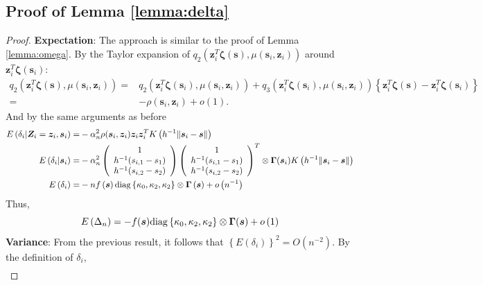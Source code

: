 \documentclass[authoryear,review, 12pt]{elsarticle}
\begin{document}
\subsection*{Proof of Lemma \ref{lemma:delta}}
\begin{proof}
\textbf{Expectation}: The approach is similar to the proof of Lemma
\ref{lemma:omega}. By the Taylor expansion of $q_{2}\left(\bm{z}_{i}^{T}\bm{\zeta}(\bm{s}),\mu\left(\bm{s}_{i},\bm{z}_{i}\right)\right)$
around $\bm{z}_{i}^{T}\bm{\zeta}(\bm{s}_{i})$:
\begin{align*}
q_{2}\left(\bm{z}_{i}^{T}\bm{\zeta}(\bm{s}),\mu(\bm{s}_{i},\bm{z}_{i})\right)= & q_{2}\left(\bm{z}_{i}^{T}\bm{\zeta}(\bm{s}_{i}),\mu(\bm{s}_{i},\bm{z}_{i})\right)+q_{3}\left(\bm{z}_{i}^{T}\bm{\zeta}(\bm{s}_{i}),\mu(\bm{s}_{i},\bm{z}_{i})\right)\left\{ \bm{z}_{i}^{T}\bm{\zeta}(\bm{s})-\bm{z}_{i}^{T}\bm{\zeta}(\bm{s}_{i})\right\} \\
= & -\rho(\bm{s}_{i},\bm{z}_{i})+o\left(1\right).
\end{align*}
And by the same arguments as before
\begin{align*}
E\left(\delta_{i}|\bm{Z}_{i}=\bm{z}_{i},\bm{s}_{i}\right)= & -\alpha_{n}^{2}\rho(\bm{s}_{i},\bm{z}_{i})\bm{z}_{i}\bm{z}_{i}^{T}K\left(h^{-1}\|\bm{s}_{i}-\bm{s}\|\right)\\
E\left(\delta_{i}|\bm{s}_{i}\right)= & -\alpha_{n}^{2}\left(\begin{array}{c}
1\\
h^{-1}(s_{i,1}-s_{1})\\
h^{-1}(s_{i,2}-s_{2})
\end{array}\right)\left(\begin{array}{c}
1\\
h^{-1}(s_{i,1}-s_{1})\\
h^{-1}(s_{i,2}-s_{2})
\end{array}\right)^{T}\otimes\bm{\Gamma}(\bm{s}_{i})K\left(h^{-1}\|\bm{s}_{i}-\bm{s}\|\right)\\
E\left(\delta_{i}\right)= & -nf\left(\bm{s}\right){\rm diag}\left\{ \kappa_{0},\kappa_{2},\kappa_{2}\right\} \otimes\bm{\Gamma}\left(\bm{s}\right)+o\left(n^{-1}\right)
\end{align*}
Thus, 
\[
E\left(\Delta_{n}\right)=-f(\bm{s}){\rm diag}\left\{ \kappa_{0},\kappa_{2},\kappa_{2}\right\} \otimes\bm{\Gamma}(\bm{s})+o\left(1\right)
\]
\textbf{Variance}: From the previous result, it follows that $\left\{ E\left(\delta_{i}\right)\right\} ^{2}=O\left(n^{-2}\right)$.
By the definition of $\delta_{i}$,
\begin{multline*}

\end{multline*}
\end{proof}
\end{document}
